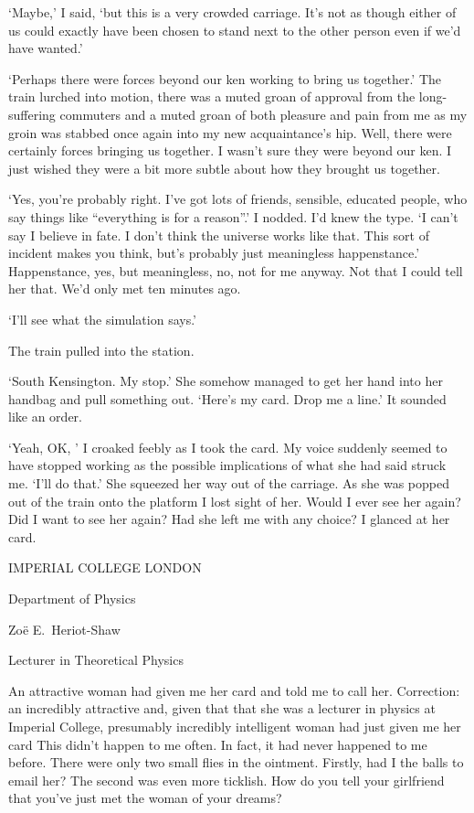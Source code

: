 `Maybe,' I said, `but this is a very crowded carriage. It's not as
though either of us could exactly have been chosen to stand next to
the other person even if we'd have wanted.'

`Perhaps there were forces beyond our ken working to bring us
together.' The train lurched into motion, there was a muted groan of
approval from the long-suffering commuters and a muted groan of both
pleasure and pain from me as my groin was stabbed once again into my
new acquaintance's hip. Well, there were certainly forces bringing
us together. I wasn't sure they were beyond our ken. I just wished
they were a bit more subtle about how they brought us together.

`Yes, you're probably right. I've got lots of friends,
sensible, educated people, who say things like ``everything is for a
reason''.' I nodded. I'd knew the type. `I can't say I believe
in fate. I don't think the universe works like that. This sort of
incident makes you think, but's probably just meaningless
happenstance.' Happenstance, yes, but meaningless, no, not for me
anyway. Not that I could tell her that. We'd only met ten minutes ago.

`I'll see what the simulation says.'

The train pulled into the station.

`South Kensington. My stop.' She somehow managed to get her hand
into her handbag and pull something out. `Here's my card. Drop me a
line.' It sounded like an order.

`Yeah, OK, ' I croaked feebly as I took the card. My voice suddenly
seemed to have stopped working as the possible implications of what
she had said struck me. `I'll do that.' She squeezed her way out
of the carriage. As she was popped out of the train onto the
platform I lost sight of her. Would I ever see her again? Did I want
to see her again? Had she left me with any choice? I glanced at her
card.

\vskip 1cm

{\twelvess \centerline{IMPERIAL COLLEGE LONDON}

\centerline{Department of Physics}

\centerline{Zoë E.~Heriot-Shaw}

\centerline{Lecturer in Theoretical Physics}}

\vskip 1cm

An attractive woman had given me her card and told me to call her.
Correction: an {\twelveit incredibly\/} attractive and, given that
that she was a lecturer in physics at Imperial College, presumably
incredibly intelligent woman had just given me her card This didn't
happen to me often. In fact, it had never happened to me before.
There were only two small flies in the ointment. Firstly, had I the
balls to email her? The second was even more ticklish. How do you
tell your girlfriend that you've just met the woman of your dreams?

